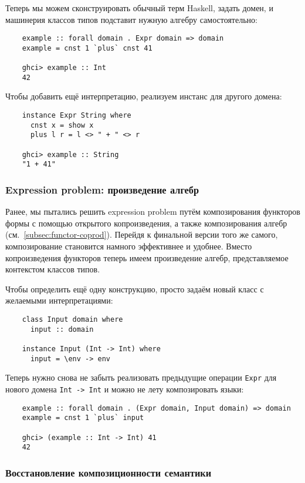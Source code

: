 Теперь мы можем сконструировать обычный терм Haskell, задать домен, и машинерия классов типов подставит нужную алгебру самостоятельно:
\begin{verbatim}
    example :: forall domain . Expr domain => domain
    example = cnst 1 `plus` cnst 41

    ghci> example :: Int
    42
\end{verbatim}

Чтобы добавить ещё интерпретацию, реализуем инстанс для другого домена:
\begin{verbatim}
    instance Expr String where
      cnst x = show x
      plus l r = l <> " + " <> r

    ghci> example :: String
    "1 + 41"
\end{verbatim}

\subsubsection{Expression problem: произведение алгебр}

Ранее, мы пытались решить expression problem путём композирования функторов формы с помощью открытого копроизведения, а также композирования алгебр (см.~\ref{subsec:functor-coprod}).
Перейдя к финальной версии того же самого, композирование становится намного эффективнее и удобнее.
Вместо копроизведения функторов теперь имеем произведение алгебр, представляемое контекстом классов типов.

Чтобы определить ещё одну конструкцию, просто задаём новый класс с желаемыми интерпретациями:
\begin{verbatim}
    class Input domain where
      input :: domain

    instance Input (Int -> Int) where
      input = \env -> env
\end{verbatim}

Теперь нужно снова не забыть реализовать предыдущие операции \texttt{Expr} для нового домена \texttt{Int -> Int} и можно не лету композировать языки:
\begin{verbatim}
    example :: forall domain . (Expr domain, Input domain) => domain
    example = cnst 1 `plus` input

    ghci> (example :: Int -> Int) 41
    42
\end{verbatim}

\subsubsection{Восстановление композиционности семантики} \label{subsubsec:recover-compositionality}

